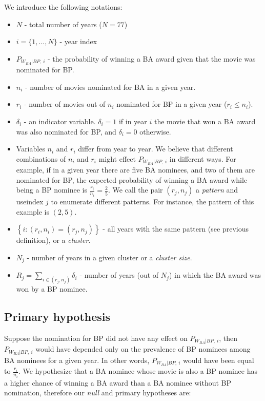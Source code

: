 \documentclass[10pt,letterpaper]{article}
\begin{document}
We introduce the following notations:
\begin{itemize}
	\item $N$ - total number of years ($N=77$)
	\item $i=\{1,...,N\}$ - year index
	\item $P_{W_{BA}|BP, ~i}$ - the probability of winning a BA award given that the movie was nominated for BP.
	\item $n_i$ - number of movies nominated for BA in a given year.
	\item $r_i$ - number of movies out of $n_i$ nominated for BP in a given year ($r_i\leq n_i$).
	\item $\delta_i$ - an indicator variable. $\delta_i=1$ if in year $i$ the movie that won a BA award was also nominated for BP, and $\delta_i=0$ otherwise.
	\item Variables $n_i$ and $r_i$ differ from year to year. We believe that different combinations of $n_i$ and $r_i$ might effect $P_{W_{BA}|BP,~i}$ in different ways. For example, if in a given year there are five BA nominees, and two of them are nominated for BP, the expected probability of winning a BA award while being a BP nominee is $\frac{r_i}{n_i} = \frac{2}{5}$. We call the pair $(r_j,n_j)$ a \emph{pattern} and useindex $j$ to enumerate different patterns. For instance, the pattern of this example is $(2, 5)$.
	\item $\left\{i: (r_i,n_i) = (r_j,n_j)\right\}$ - all years with the same pattern (see previous definition), or a \emph{cluster}.
	\item $N_j$ - number of years in a given cluster or a \emph{cluster size}.
	\item $R_j = \sum_{i \in (r_j,n_j)} \delta_i$ - number of years (out of $N_j$) in which the BA award was won by a BP  nominee.
\end{itemize}

\subsection*{Primary hypothesis}
Suppose the nomination for BP did not have any effect on $P_{W_{BA}|BP, ~i}$, then $P_{W_{BA}|BP, ~i}$ would have depended only on the prevalence of BP nominees among BA nominees for a given year. In other words, $P_{W_{BA}|BP, ~i}$ would have been equal to $\frac{r_i}{n_i}$. We hypothesize that a BA nominee whose movie is also a BP nominee has a higher chance of winning a BA award than a BA nominee without BP nomination, therefore our \emph{null} and primary hypotheses are:
\end{document}
